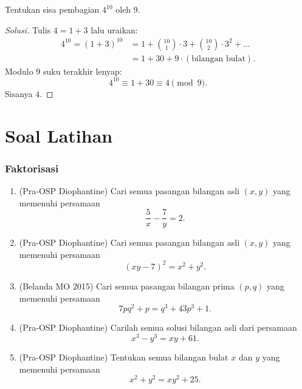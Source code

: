 \documentclass[12pt]{scrartcl}
\begin{document}
\begin{example}
Tentukan sisa pembagian $4^{10}$ oleh $9$.
\end{example}
\begin{proof}[Solusi]
Tulis $4 = 1 + 3$ lalu uraikan:
\begin{align*}
4^{10} = (1 + 3)^{10} &= 1 + \binom{10}{1} \cdot 3 + \binom{10}{2} \cdot 3^2 + \dots \\
&= 1 + 30 + 9 \cdot (\text{bilangan bulat}).
\end{align*}
Modulo $9$ suku terakhir lenyap:
\[ 4^{10} \equiv 1 + 30 \equiv 4 \pmod{9}. \]
Sisanya $4$.
\end{proof}

\part*{Soal Latihan}

\section{Faktorisasi}
\begin{enumerate}

	\item (Pra-OSP Diophantine)
	Cari semua pasangan bilangan asli $(x, y)$ yang memenuhi persamaan
	\[ \frac{5}{x} - \frac{7}{y} = 2. \]

	\item (Pra-OSP Diophantine)
	Cari semua pasangan bilangan asli $(x, y)$ yang memenuhi persamaan
	\[ (xy - 7)^2 = x^2 + y^2. \]

	\item (Belanda MO 2015)
	Cari semua pasangan bilangan prima $(p, q)$ yang memenuhi persamaan
	\[ 7pq^2 + p = q^3 + 43p^3 + 1. \]

	\item (Pra-OSP Diophantine)
	Carilah semua solusi bilangan asli dari persamaan
	\[ x^3 - y^3 = xy + 61. \]

	\item (Pra-OSP Diophantine)
	Tentukan semua bilangan bulat $x$ dan $y$ yang memenuhi persamaan
	\[ x^2 + y^2 = xy^2 + 25. \]

\end{enumerate}
\end{document}
